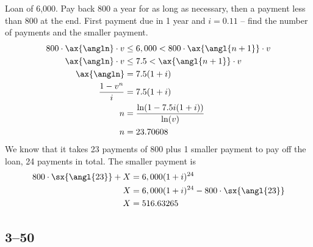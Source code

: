 \documentclass[a4paper, 12pt, reqno]{amsart}
\numberwithin{equation}{section}
\begin{document}
Loan of 6,000. Pay back 800 a year for as long as necessary, then a payment
less than 800 at the end. First payment due in 1 year and $i=0.11$ -- find the
number of payments and the smaller payment.
\begin{equation}\nonumber
    \begin{aligned}
        800 \cdot \ax{\angln} \cdot v &\le 6,000 < 800 \cdot
            \ax{\angl{n+1}}\cdot v \\
        \ax{\angln} \cdot v &\le 7.5 < \ax{\angl{n+1}} \cdot v         \\
        \ax{\angln} &= 7.5(1+i)                                        \\
        \frac{1-v^n}{i} &= 7.5(1+i)       \\
        n &= \frac{\ln(1-7.5i(1+i))}{\ln(v)} \\
        n &= 23.70608
    \end{aligned}
\end{equation}
We know that it takes 23 payments of 800 plus 1 smaller payment to pay off the
loan, 24 payments in total. The smaller payment is
\begin{equation}\nonumber
    \begin{aligned}
        800 \cdot \sx{\angl{23}} + X &= 6,000(1+i)^{24}         \\
        X &= 6,000(1+i)^{24} - 800 \cdot \sx{\angl{23}}         \\
        X &= 516.63265
    \end{aligned}
\end{equation}

\subsection*{3--50}
\end{document}
